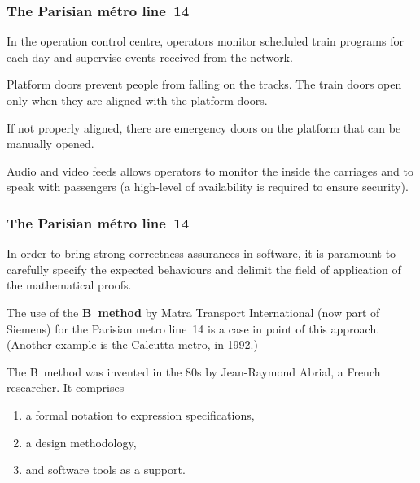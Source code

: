 \documentclass[compress,dvipdfmx]{beamer}
\begin{document}
\begin{frame}
  \frametitle{The Parisian métro line~14}

  In the operation control centre, operators monitor scheduled train
  programs for each day and supervise events received from the
  network.

  \bigskip

  Platform doors prevent people from falling on the tracks. The train
  doors open only when they are aligned with the platform doors.

  \bigskip

  If not properly aligned, there are emergency doors on the platform
  that can be manually opened.

  \bigskip

  Audio and video feeds allows operators to monitor the inside the
  carriages and to speak with passengers (a high\hyp{}level of
  availability is required to ensure security).

\end{frame}


\begin{frame}
  \frametitle{The Parisian métro line~14}

  In order to bring strong correctness assurances in software, it is
  paramount to carefully specify the expected behaviours and delimit
  the field of application of the mathematical proofs.

  \bigskip

  The use of the \textbf{B~method} by Matra Transport International
  (now part of Siemens) for the Parisian metro line~14 is a case in
  point of this approach. (Another example is the Calcutta metro, in
  1992.)

  \bigskip

   The B~method was invented in the 80s by Jean-Raymond Abrial, a
   French researcher. It comprises
   \begin{enumerate}

     \item a formal notation to expression specifications,

     \item a design methodology,

     \item and software tools as a support.

   \end{enumerate}

\end{frame}
\end{document}
